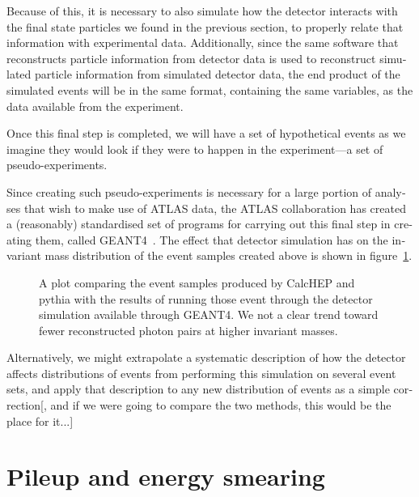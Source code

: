 \begin{english}
Because of this, it is necessary to also simulate how the detector interacts with the final state particles we found in the previous section, to properly relate that information with experimental data. Additionally, since the same software that reconstructs particle information from detector data is used to reconstruct simulated particle information from simulated detector data, the end product of the simulated events will be in the same format, containing the same variables, as the data available from the experiment.

Once this final step is completed, we will have a set of hypothetical events as we imagine they would look if they were to happen in the experiment---a set of pseudo-experiments.

Since creating such pseudo-experiments is necessary for a large portion of analyses that wish to make use of ATLAS data, the ATLAS collaboration has created a (reasonably) standardised set of programs for carrying out this final step in creating them, called GEANT4~\cite{geant4}. The effect that detector simulation has on the invariant mass distribution of the event samples created above is shown in figure~\ref{geant-beaf}.

\begin{figure}[hbt]
\begin{minipage}[b]{.69\textwidth}
\begin{infilsf} \tiny

\end{infilsf}
\end{minipage}
\hfill\begin{minipage}[b]{.3\textwidth}
\caption{A plot comparing the event samples produced by CalcHEP and pythia with the results of running those event through the detector simulation available through GEANT4. We not a clear trend toward fewer reconstructed photon pairs at higher invariant masses. \label{geant-beaf}}
\end{minipage}
\end{figure}

Alternatively, we might extrapolate a systematic description of how the detector affects distributions of events from performing this simulation on several event sets, and apply that description to any new distribution of events as a simple correction[, and if we were going to compare the two methods, this would be the place for it...]

\section{Pileup and energy smearing}


\end{english}
